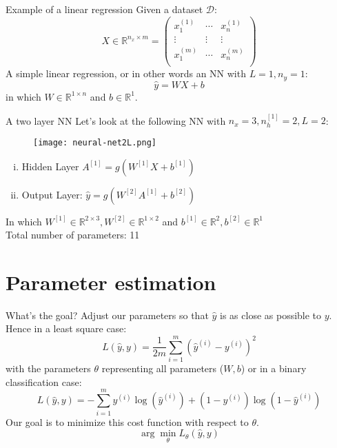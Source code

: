 \documentclass{beamer}
\begin{document}
\begin{frame}[t]{Example of a linear regression}
  Given a dataset $\mathcal{D}$:
  \begin{equation}
    X \in \mathbb{R}^{n_x \times m}  = 
    \begin{pmatrix}
      x^{(1)}_1 & \cdots & x^{(1)}_n \\
      \vdots & \vdots & \vdots \\
      x^{(m)}_1 & \cdots & x^{(m)}_n \\
    \end{pmatrix}
  \end{equation}
  A simple linear regression, or in other words an NN with $L=1, n_y=1$:
  \begin{equation}
    \hat{y} = WX+b
  \end{equation}
  in which $W \in \mathbb{R}^{1 \times n}$ and $b \in \mathbb{R}^{1}$.
\end{frame}

\begin{frame}[t]{A two layer NN}
  \small
  Let's look at the following NN with $n_x=3, n_h^{[1]} = 2, L=2$:
  \begin{figure}[htpb]
    \centering
    \texttt{[image: neural-net2L.png]}
  \end{figure}
  \begin{enumerate}[(i)]
    \item Hidden Layer $A^{[1]} = g(W^{[1]}X + b^{[1]})$
    \item Output Layer: $\hat{y} = g(W^{[2]}A^{[1]} + b^{[2]})$
  \end{enumerate}
  In which $W^{[1]} \in \mathbb{R}^{2\times 3}, W^{[2]} \in \mathbb{R}^{1 \times 2}$ and
  $b^{[1]} \in \mathbb{R}^{2}, b^{[2]} \in \mathbb{R}^{1}$ \\
  Total number of parameters: 11
\end{frame}

\section{Parameter estimation}
\label{sec:the_basics}

\begin{frame}[t]{What's the goal?}
  Adjust our parameters so that $\hat{y}$ is as close as possible to $y$. Hence in a least square case:
  \begin{equation}
    L(\hat{y}, y) = \frac{1}{2m} \sum^m_{i=1} {(\hat{y}^{(i)} - y^{(i)})}^2
  \end{equation}
  with the parameters $\theta$ representing all parameters ($W, b$) or in a binary classification case:
  \begin{equation}
    L(\hat{y}, y) = - \sum^m_{i=1} y^{(i)}\log(\hat{y}^{(i)}) + (1- y^{(i)})\log(1-\hat{y}^{(i)})
  \end{equation}
  Our goal is to minimize this cost function with respect to $\theta$.
  \begin{equation}
    \arg\min_\theta{L_\theta(\hat{y}, y)}
  \end{equation}
\end{frame}
\end{document}
